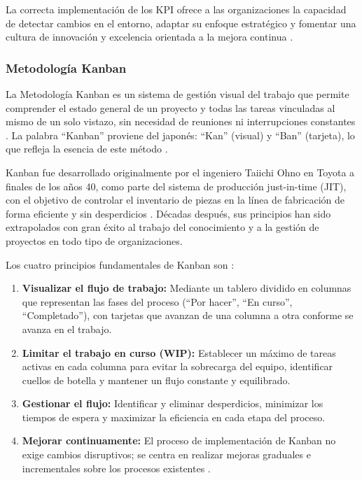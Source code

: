 \documentclass[12pt, letterpaper]{article}
\begin{document}
La correcta implementación de los KPI ofrece a las organizaciones la capacidad de detectar cambios
en el entorno, adaptar su enfoque estratégico y fomentar una cultura de innovación y excelencia
orientada a la mejora continua \cite{escadia2024}.

\subsubsection{Metodología Kanban}

La Metodología Kanban es un sistema de gestión visual del trabajo que permite comprender el estado
general de un proyecto y todas las tareas vinculadas al mismo de un solo vistazo, sin necesidad
de reuniones ni interrupciones constantes \cite{cegos2026}. La palabra ``Kanban'' proviene del
japonés: ``Kan'' (visual) y ``Ban'' (tarjeta), lo que refleja la esencia de este método \cite{apd2024}.

Kanban fue desarrollado originalmente por el ingeniero Taiichi Ohno en Toyota a finales de los años
40, como parte del sistema de producción just-in-time (JIT), con el objetivo de controlar el
inventario de piezas en la línea de fabricación de forma eficiente y sin desperdicios \cite{cegos2026}.
Décadas después, sus principios han sido extrapolados con gran éxito al trabajo del conocimiento y
a la gestión de proyectos en todo tipo de organizaciones.

Los cuatro principios fundamentales de Kanban son \cite{atlassian2026}:

\begin{enumerate}[leftmargin=1.5em, itemsep=2pt]
  \item \textbf{Visualizar el flujo de trabajo:} Mediante un tablero dividido en columnas que
        representan las fases del proceso (``Por hacer'', ``En curso'', ``Completado''), con tarjetas
        que avanzan de una columna a otra conforme se avanza en el trabajo.
  \item \textbf{Limitar el trabajo en curso (WIP):} Establecer un máximo de tareas activas en cada
        columna para evitar la sobrecarga del equipo, identificar cuellos de botella y mantener un
        flujo constante y equilibrado.
  \item \textbf{Gestionar el flujo:} Identificar y eliminar desperdicios, minimizar los tiempos de
        espera y maximizar la eficiencia en cada etapa del proceso.
  \item \textbf{Mejorar continuamente:} El proceso de implementación de Kanban no exige cambios
        disruptivos; se centra en realizar mejoras graduales e incrementales sobre los procesos
        existentes \cite{atlassian2026}.
\end{enumerate}
\end{document}
